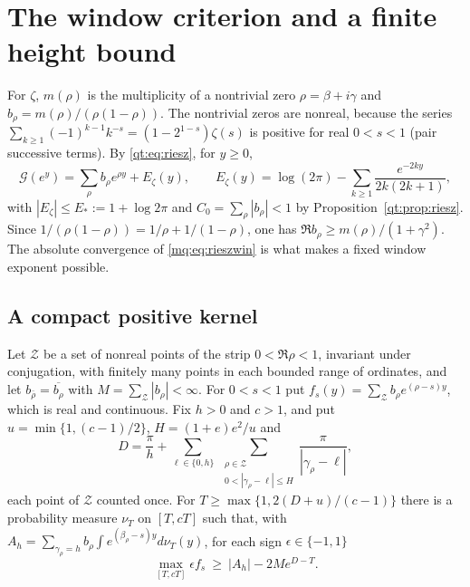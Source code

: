 \section{The window criterion and a finite height bound}\label{mq:sec:window}

For $\zeta$, $m(\rho)$ is the multiplicity of a nontrivial zero $\rho=\beta+i\gamma$ and $b_\rho=m(\rho)/(\rho(1-\rho))$. The nontrivial zeros are nonreal, because the series $\sum_{k\ge1}(-1)^{k-1}k^{-s}=(1-2^{1-s})\zeta(s)$ is positive for real $0<s<1$ (pair successive terms). By \eqref{qt:eq:riesz}, for $y\ge0$,
\begin{equation}\label{mq:eq:rieszwin}
\mathcal G(e^y)=\sum_\rho b_\rho e^{\rho y}+E_\zeta(y),\qquad E_\zeta(y)=\log(2\pi)-\sum_{k\ge1}\frac{e^{-2ky}}{2k(2k+1)},
\end{equation}
with $|E_\zeta|\le E_*:=1+\log2\pi$ and $C_0=\sum_\rho|b_\rho|<1$ by Proposition~\ref{qt:prop:riesz}. Since $1/(\rho(1-\rho))=1/\rho+1/(1-\rho)$, one has $\Re b_\rho\ge m(\rho)/(1+\gamma^2)$. The absolute convergence of \eqref{mq:eq:rieszwin} is what makes a fixed window exponent possible.

\subsection{A compact positive kernel}

\begin{lemma}\label{mq:lem:kernel}
Let $\mathcal Z$ be a set of nonreal points of the strip $0<\Re\rho<1$, invariant under conjugation, with finitely many points in each bounded range of ordinates, and let $b_{\bar\rho}=\overline{b_\rho}$ with $M=\sum_{\mathcal Z}|b_\rho|<\infty$. For $0<s<1$ put $f_s(y)=\sum_{\mathcal Z}b_\rho e^{(\rho-s)y}$, which is real and continuous. Fix $h>0$ and $c>1$, and put $u=\min\{1,(c-1)/2\}$, $H=(1+e)e^2/u$ and
\[
D=\frac\pi h+\sum_{\ell\in\{0,h\}}\ \sum_{\substack{\rho\in\mathcal Z\\0<|\gamma_\rho-\ell|\le H}}\frac\pi{|\gamma_\rho-\ell|},
\]
each point of $\mathcal Z$ counted once. For $T\ge\max\{1,2(D+u)/(c-1)\}$ there is a probability measure $\nu_T$ on $[T,cT]$ such that, with $A_h=\sum_{\gamma_\rho=h}b_\rho\int e^{(\beta_\rho-s)y}d\nu_T(y)$, for each sign $\epsilon\in\{-1,1\}$
\[
\max_{[T,cT]}\epsilon f_s\ \ge\ |A_h|-2Me^{D-T}.
\]
\end{lemma}

